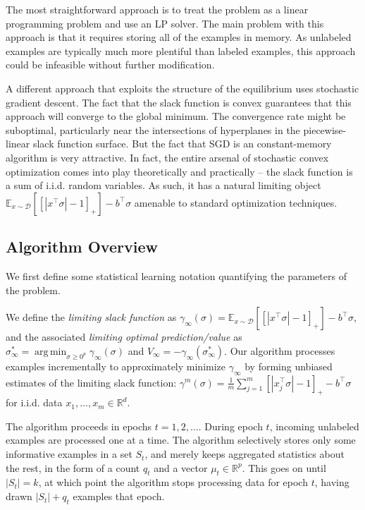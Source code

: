 \documentclass{colt2019} %
\DeclareMathOperator*{\argmin}{arg\,min}
\newcommand{\RR}{\mathbb{R}}      %
\newcommand{\evp}[2]{\mathbb{E}_{#2} \left[#1\right]} %
\newcommand{\abs}[1]{\left| #1 \right|}
\newcommand{\cD}{\mathcal{D}}
\begin{document}
The most straightforward approach is to treat the problem as a linear
programming problem and use an LP solver. The main problem with this
approach is that it requires storing all of the examples in memory. As
unlabeled examples are typically much more plentiful than labeled
examples, this approach could be infeasible without further modification.

A different approach that exploits the structure of the equilibrium uses stochastic gradient descent. The fact
that the slack function is convex guarantees that this approach will converge to the global minimum. 
The convergence rate might be suboptimal, particularly near the intersections of hyperplanes 
in the piecewise-linear slack function surface. But the fact that SGD is an constant-memory algorithm is very attractive. 
In fact, the entire arsenal of stochastic convex optimization comes into play theoretically and practically 
-- the slack function is a sum of i.i.d. random variables. 
As such, it has a natural limiting object $\evp{\left[ \abs{x^\top \sigma} - 1 \right]_{+}}{x \sim \cD} - b^\top \sigma$ 
amenable to standard optimization techniques. 




\iffalse

\subsection{Algorithm Overview}
We first define some statistical learning notation quantifying the parameters of the problem. 

We define the \emph{limiting slack function} as 
$\gamma_\infty (\sigma) = \evp{\left[ \abs{x^\top \sigma} - 1 \right]_{+}}{x \sim \cD} - b^\top \sigma$, 
and the associated \emph{limiting optimal prediction/value} as $\sigma_{\infty}^* = \argmin_{\sigma \geq 0^p} \gamma_\infty (\sigma)$ 
and $V_{\infty} = - \gamma_\infty (\sigma_{\infty}^*)$. 
Our algorithm processes examples incrementally to approximately minimize $\gamma_\infty$ 
by forming unbiased estimates of the limiting slack function: 
$\gamma^m (\sigma) = \frac{1}{m} \sum_{j=1}^m \left[ \abs{x_{j}^\top \sigma} - 1 \right]_{+} - b^\top \sigma$ 
for i.i.d. data $x_1, \dots, x_m \in \RR^d$. 

The algorithm proceeds in epochs $t = 1, 2, \dots$. 
During epoch $t$, incoming unlabeled examples are processed one at a time. 
The algorithm selectively stores only some informative examples in a set $S_t$, 
and merely keeps aggregated statistics 
about the rest, in the form of a count $q_t$ and a vector $\mu_t \in \RR^p$. 
This goes on until $\abs{S_t} = k$, 
at which point the algorithm stops processing data for epoch $t$, 
having drawn $\abs{S_t} + q_t$ examples that epoch. 
\end{document}
